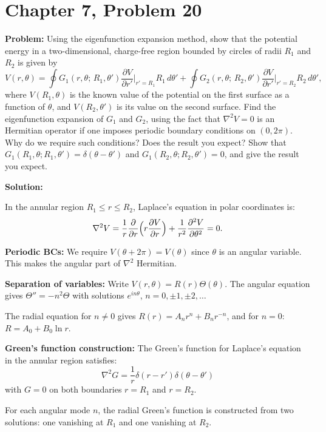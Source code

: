 \documentclass[12pt]{article}
\begin{document}
\section*{Chapter 7, Problem 20}

\textbf{Problem:} Using the eigenfunction expansion method, show that the potential energy in a two-dimensional, charge-free region bounded by circles of radii $R_1$ and $R_2$ is given by
\[
V(r,\theta) = \oint G_1(r,\theta;\,R_1,\theta')\frac{\partial V}{\partial r'}\bigg|_{r'=R_1}R_1\,d\theta' + \oint G_2(r,\theta;\,R_2,\theta')\frac{\partial V}{\partial r'}\bigg|_{r'=R_2}R_2\,d\theta',
\]
where $V(R_1,\theta)$ is the known value of the potential on the first surface as a function of $\theta$, and $V(R_2,\theta')$ is its value on the second surface. Find the eigenfunction expansion of $G_1$ and $G_2$, using the fact that $\nabla^2 V = 0$ is an Hermitian operator if one imposes periodic boundary conditions on $(0,2\pi)$. Why do we require such conditions? Does the result you expect? Show that $G_1(R_1,\theta;R_1,\theta') = \delta(\theta-\theta')$ and $G_1(R_2,\theta;R_2,\theta') = 0$, and give the result you expect.

\bigskip
\textbf{Solution:}

In the annular region $R_1 \le r \le R_2$, Laplace's equation in polar coordinates is:
\[
\nabla^2 V = \frac{1}{r}\frac{\partial}{\partial r}\Bigl(r\frac{\partial V}{\partial r}\Bigr) + \frac{1}{r^2}\frac{\partial^2 V}{\partial\theta^2} = 0.
\]

\textbf{Periodic BCs:} We require $V(\theta + 2\pi) = V(\theta)$ since $\theta$ is an angular variable. This makes the angular part of $\nabla^2$ Hermitian.

\textbf{Separation of variables:} Write $V(r,\theta) = R(r)\Theta(\theta)$. The angular equation gives $\Theta'' = -n^2\Theta$ with solutions $e^{in\theta}$, $n = 0, \pm 1, \pm 2, \ldots$

The radial equation for $n \neq 0$ gives $R(r) = A_n r^n + B_n r^{-n}$, and for $n = 0$: $R = A_0 + B_0\ln r$.

\textbf{Green's function construction:} The Green's function for Laplace's equation in the annular region satisfies:
\[
\nabla^2 G = \frac{1}{r}\delta(r-r')\delta(\theta-\theta')
\]
with $G = 0$ on both boundaries $r = R_1$ and $r = R_2$.

For each angular mode $n$, the radial Green's function is constructed from two solutions: one vanishing at $R_1$ and one vanishing at $R_2$.
\end{document}
